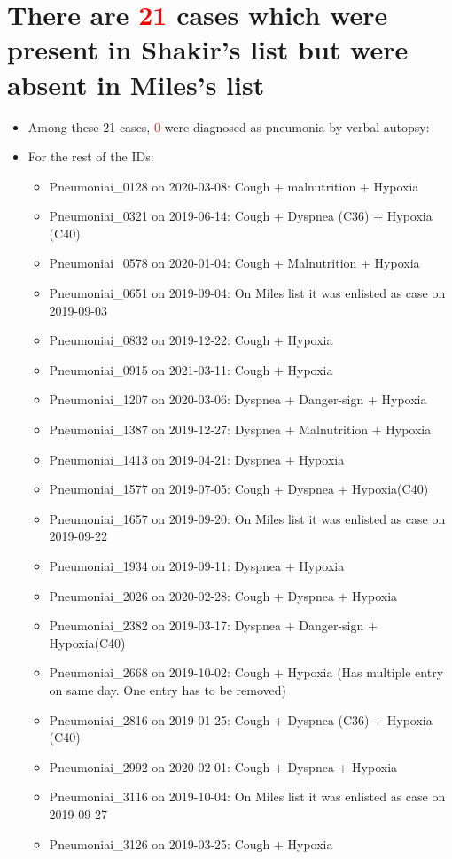\documentclass[
]{article}
\providecommand{\tightlist}{%
  \setlength{\itemsep}{0pt}\setlength{\parskip}{0pt}}
\begin{document}
\hypertarget{there-are-cases-which-were-present-in-shakirs-list-but-were-absent-in-miless-list}{%
\section{\texorpdfstring{There are \textcolor{red}{21} cases which were
present in Shakir's list but were absent in Miles's
list}{There are  cases which were present in Shakir's list but were absent in Miles's list}}\label{there-are-cases-which-were-present-in-shakirs-list-but-were-absent-in-miless-list}}

\begin{itemize}
\item
  Among these 21 cases, \textcolor{red}{0} were diagnosed as pneumonia
  by verbal autopsy:
\item
  For the rest of the IDs:

  \begin{itemize}
  \tightlist
  \item
    Pneumoniai\_0128 on 2020-03-08: Cough + malnutrition + Hypoxia
  \item
    Pneumoniai\_0321 on 2019-06-14: Cough + Dyspnea (C36) + Hypoxia
    (C40)
  \item
    Pneumoniai\_0578 on 2020-01-04: Cough + Malnutrition + Hypoxia
  \item
    Pneumoniai\_0651 on 2019-09-04: On Miles list it was enlisted as
    case on 2019-09-03
  \item
    Pneumoniai\_0832 on 2019-12-22: Cough + Hypoxia
  \item
    Pneumoniai\_0915 on 2021-03-11: Cough + Hypoxia
  \item
    Pneumoniai\_1207 on 2020-03-06: Dyspnea + Danger-sign + Hypoxia
  \item
    Pneumoniai\_1387 on 2019-12-27: Dyspnea + Malnutrition + Hypoxia
  \item
    Pneumoniai\_1413 on 2019-04-21: Dyspnea + Hypoxia
  \item
    Pneumoniai\_1577 on 2019-07-05: Cough + Dyspnea + Hypoxia(C40)
  \item
    Pneumoniai\_1657 on 2019-09-20: On Miles list it was enlisted as
    case on 2019-09-22
  \item
    Pneumoniai\_1934 on 2019-09-11: Dyspnea + Hypoxia
  \item
    Pneumoniai\_2026 on 2020-02-28: Cough + Dyspnea + Hypoxia
  \item
    Pneumoniai\_2382 on 2019-03-17: Dyspnea + Danger-sign + Hypoxia(C40)
  \item
    Pneumoniai\_2668 on 2019-10-02: Cough + Hypoxia (Has multiple entry
    on same day. One entry has to be removed)
  \item
    Pneumoniai\_2816 on 2019-01-25: Cough + Dyspnea (C36) + Hypoxia
    (C40)
  \item
    Pneumoniai\_2992 on 2020-02-01: Cough + Dyspnea + Hypoxia
  \item
    Pneumoniai\_3116 on 2019-10-04: On Miles list it was enlisted as
    case on 2019-09-27
  \item
    Pneumoniai\_3126 on 2019-03-25: Cough + Hypoxia
  \end{itemize}
\end{itemize}
\end{document}
